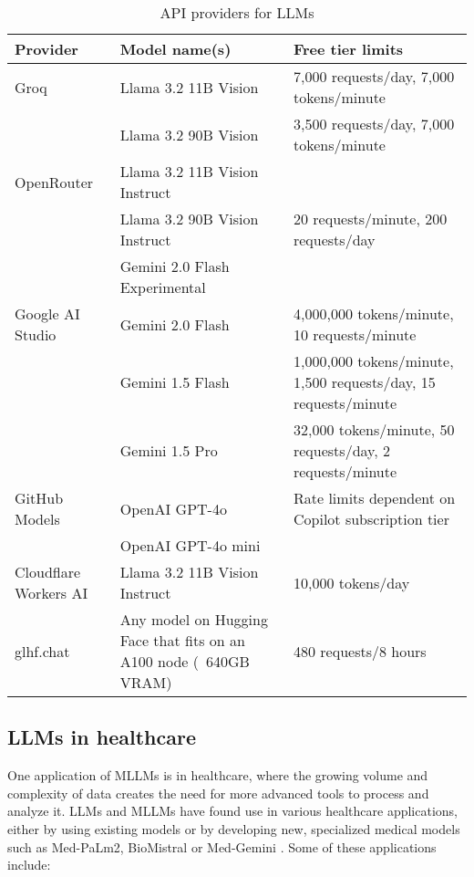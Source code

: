\begin{table}[h!]
    \centering
    \begin{tabular}{p{2cm} p{5cm} p{6cm}}
        \toprule
        \textbf{Provider} & \textbf{Model name(s)} & \textbf{Free tier limits} \\
        \midrule
        \raggedright
        Groq & Llama 3.2 11B Vision & 7,000 requests/day, 7,000 tokens/minute \\
        & Llama 3.2 90B Vision & 3,500 requests/day, 7,000 tokens/minute \\
        \hline
        \raggedright
        OpenRouter & Llama 3.2 11B Vision Instruct &  \\
        & Llama 3.2 90B Vision Instruct & 20 requests/minute, 200 requests/day \\
        & Gemini 2.0 Flash Experimental &  \\
        \hline
        \raggedright
        Google AI Studio & Gemini 2.0 Flash & 4,000,000 tokens/minute, 10 requests/minute \\
        & Gemini 1.5 Flash & 1,000,000 tokens/minute, 1,500 requests/day, 15 requests/minute \\
        & Gemini 1.5 Pro & 32,000 tokens/minute, 50 requests/day, 2 requests/minute \\
        \hline
        \raggedright
        GitHub Models & OpenAI GPT-4o & Rate limits dependent on Copilot subscription tier \\
        & OpenAI GPT-4o mini & \\
        \hline
        \raggedright
        Cloudflare Workers AI & Llama 3.2 11B Vision Instruct & 10,000 tokens/day \\
        \hline
        \raggedright
        glhf.chat & Any model on Hugging Face that fits on an A100 node (~640GB VRAM)& 480 requests/8 hours \\
        \bottomrule
    \end{tabular}
    \caption{API providers for LLMs}
    \label{tab:llm_apis}
\end{table}

\FloatBarrier
\clearpage

\subsection{LLMs in healthcare}

One application of MLLMs is in healthcare, where the growing volume and complexity of data creates the need for more advanced tools to process and analyze it. LLMs and MLLMs have found use in various healthcare applications, either by using existing models or by developing new, specialized medical models such as Med-PaLm2, BioMistral or Med-Gemini \parencite{biomistral,medgemini,medpalm2}. Some of these applications include:


